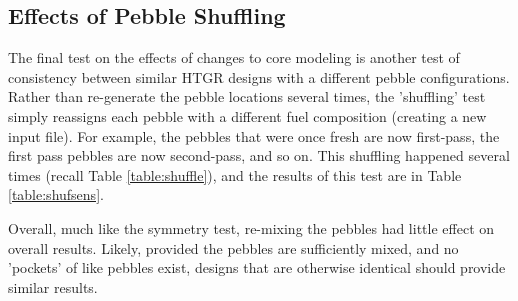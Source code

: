 \subsection{Effects of Pebble Shuffling}
\label{res-shuff}

The final test on the effects of changes to core modeling is another test of consistency between similar HTGR designs with a different pebble configurations.  Rather than re-generate the pebble locations several times, the 'shuffling' test simply reassigns each pebble with a different fuel composition (creating a new input file).  For example, the pebbles that were once fresh are now first-pass, the first pass pebbles are now second-pass, and so on.  This shuffling happened several times (recall Table \ref{table:shuffle}), and the results of this test are in Table \ref{table:shufsens}.



Overall, much like the symmetry test, re-mixing the pebbles had little effect on overall results.  Likely, provided the pebbles are sufficiently mixed, and no 'pockets' of like pebbles exist, designs that are otherwise identical should provide similar results. 